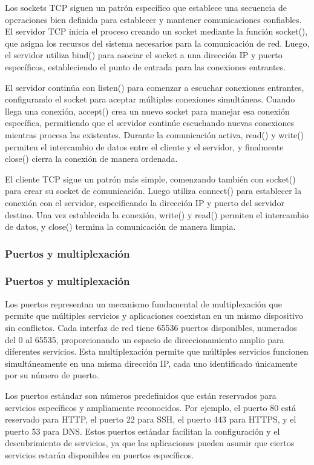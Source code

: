 \begin{itemize}
Los sockets TCP siguen un patrón específico que establece una secuencia de operaciones bien definida para establecer y mantener comunicaciones confiables. El servidor TCP inicia el proceso creando un socket mediante la función socket(), que asigna los recursos del sistema necesarios para la comunicación de red. Luego, el servidor utiliza bind() para asociar el socket a una dirección IP y puerto específicos, estableciendo el punto de entrada para las conexiones entrantes.

El servidor continúa con listen() para comenzar a escuchar conexiones entrantes, configurando el socket para aceptar múltiples conexiones simultáneas. Cuando llega una conexión, accept() crea un nuevo socket para manejar esa conexión específica, permitiendo que el servidor continúe escuchando nuevas conexiones mientras procesa las existentes. Durante la comunicación activa, read() y write() permiten el intercambio de datos entre el cliente y el servidor, y finalmente close() cierra la conexión de manera ordenada.

El cliente TCP sigue un patrón más simple, comenzando también con socket() para crear su socket de comunicación. Luego utiliza connect() para establecer la conexión con el servidor, especificando la dirección IP y puerto del servidor destino. Una vez establecida la conexión, write() y read() permiten el intercambio de datos, y close() termina la comunicación de manera limpia.

\subsubsection{Puertos y multiplexación}

\subsubsection{Puertos y multiplexación}

Los puertos representan un mecanismo fundamental de multiplexación que permite que múltiples servicios y aplicaciones coexistan en un mismo dispositivo sin conflictos. Cada interfaz de red tiene 65536 puertos disponibles, numerados del 0 al 65535, proporcionando un espacio de direccionamiento amplio para diferentes servicios. Esta multiplexación permite que múltiples servicios funcionen simultáneamente en una misma dirección IP, cada uno identificado únicamente por su número de puerto.

Los puertos estándar son números predefinidos que están reservados para servicios específicos y ampliamente reconocidos. Por ejemplo, el puerto 80 está reservado para HTTP, el puerto 22 para SSH, el puerto 443 para HTTPS, y el puerto 53 para DNS. Estos puertos estándar facilitan la configuración y el descubrimiento de servicios, ya que las aplicaciones pueden asumir que ciertos servicios estarán disponibles en puertos específicos.


\end{itemize}
